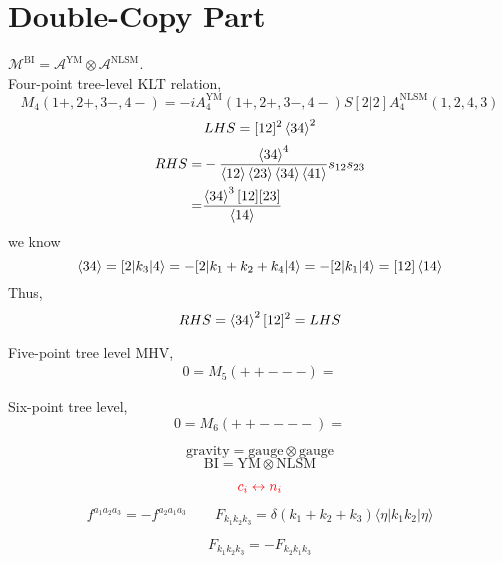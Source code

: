 \documentclass[a4paper,11pt]{article}
\newcommand{\rsh}[3]{[#1|#2|#3\rangle}
\begin{document}
\section{Double-Copy Part}
$\mathcal{M}^{\text{BI}}=\mathcal{A}^{\text{YM}}\otimes \mathcal{A}^{\text{NLSM}}$.\\
Four-point tree-level KLT relation,
\begin{equation}
    M_4(1+,2+,3-,4-)=-i A_4^{\text{YM}}(1+,2+,3-,4-)S[2|2]A^{\text{NLSM}}_4(1,2,4,3)
\end{equation}
\begin{equation}
    LHS=[12]^2\braket{34}^2
\end{equation}
\begin{equation}
    \begin{split}
        RHS=&-\frac{\braket{34}^4}{\braket{12}\braket{23}\braket{34}\braket{41}}s_{12}s_{23}\\
        =&\frac{\braket{34}^3[12][23]}{\braket{14}}
    \end{split}
\end{equation}
we know 
\begin{equation}
    [23]\braket{34}=\rsh{2}{k_3}{4}=-\rsh{2}{k_1+k_2+k_4}{4}=-\rsh{2}{k_1}{4}=[12]\braket{14}
\end{equation}
Thus,
\begin{equation}
    RHS=\braket{34}^2[12]^2=LHS
\end{equation}

Five-point tree level MHV,
\begin{equation}
    \begin{split}
    0=M_5(++---)=
    \end{split}
\end{equation}

Six-point tree level,
\begin{equation}
    0=M_6(++----)=
\end{equation}

\begin{equation}
    \text{gravity}=\text{gauge}\otimes \text{gauge}
\end{equation} 
\begin{equation}
    \text{BI}=\text{YM}\otimes\text{NLSM}
\end{equation}

\[ \mathcolor{red}{c_i\leftrightarrow {n_i}}\]

\[f^{a_1 a_2 a_3}=-f^{a_2 a_1 a_3}\qquad F_{k_1 k_2 k_3}=\delta(k_1+k_2+k_3)\langle \eta |k_1k_2|\eta\rangle\]

\[F_{k_1 k_2 k_3}=-F_{k_2 k_1 k_3}\]
\end{document}
